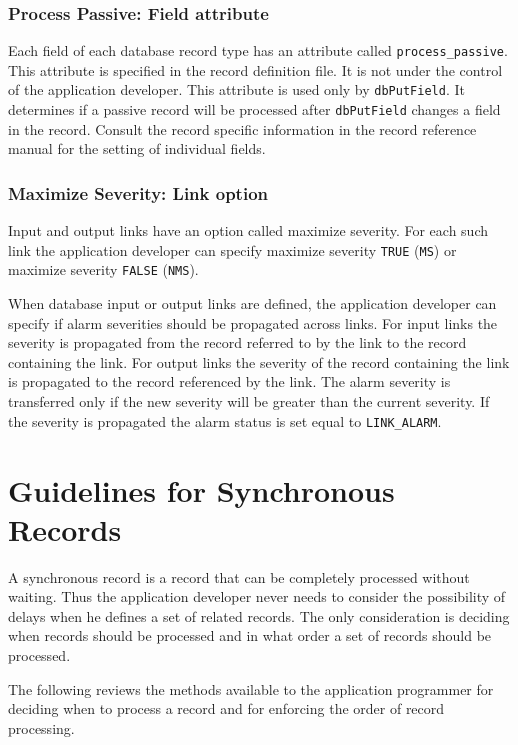 \subsubsection{Process Passive: Field attribute }

Each field of each database record type has an attribute called \verb|process_passive|. This attribute is specified in the  
record definition file. It is not under the control of the application developer. This attribute is used only by \verb|dbPutField|. 
It determines if a passive record will be processed after \verb|dbPutField| changes a field in the record. Consult the record 
specific information in the record reference manual for the setting of individual fields.

\subsubsection{Maximize Severity: Link option}

Input and output links have an option called maximize severity. For each such link the application developer can specify 
maximize severity \verb|TRUE| (\verb|MS|) or maximize severity \verb|FALSE| (\verb|NMS|). 

When database input or output links are defined, the application developer can specify if alarm severities should be 
propagated across links. For input links the severity is propagated from the record referred to by the link to the record 
containing the link. For output links the severity of the record containing the link is propagated to the record referenced by 
the link. The alarm severity is transferred only if the new severity will be greater than the current severity. If the severity 
is propagated the alarm status is set equal to \verb|LINK_ALARM|.

\section{Guidelines for Synchronous Records}

A synchronous record is a record that can be completely processed without waiting. Thus the application developer never 
needs to consider the possibility of delays when he defines a set of related records. The only consideration is deciding 
when records should be processed and in what order a set of records should be processed.

The following reviews the methods available to the application programmer for deciding when to process a record and for 
enforcing the order of record processing.

